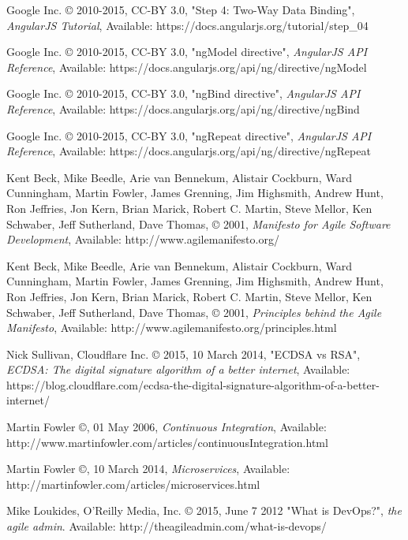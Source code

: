 \begin{thebibliography}{999}
\raggedright
Google Inc. © 2010-2015, CC-BY 3.0, "Step 4: Two-Way Data Binding",
{\em AngularJS Tutorial},
Available: https://docs.angularjs.org/tutorial/step\_04

\raggedright
Google Inc. © 2010-2015, CC-BY 3.0, "ngModel directive",
{\em AngularJS API Reference},
Available: https://docs.angularjs.org/api/ng/directive/ngModel

\raggedright
Google Inc. © 2010-2015, CC-BY 3.0, "ngBind directive",
{\em AngularJS API Reference},
Available: https://docs.angularjs.org/api/ng/directive/ngBind

\raggedright
Google Inc. © 2010-2015, CC-BY 3.0, "ngRepeat directive",
{\em AngularJS API Reference},
Available: https://docs.angularjs.org/api/ng/directive/ngRepeat

\raggedright
Kent Beck, Mike Beedle, Arie van Bennekum, Alistair Cockburn, Ward Cunningham,
Martin Fowler, James Grenning, Jim Highsmith, Andrew Hunt, Ron Jeffries, Jon
Kern, Brian Marick, Robert C. Martin, Steve Mellor, Ken Schwaber, Jeff
Sutherland, Dave Thomas, © 2001,
{\em Manifesto for Agile Software Development},
Available: http://www.agilemanifesto.org/

\raggedright
Kent Beck, Mike Beedle, Arie van Bennekum, Alistair Cockburn, Ward Cunningham,
Martin Fowler, James Grenning, Jim Highsmith, Andrew Hunt, Ron Jeffries, Jon
Kern, Brian Marick, Robert C. Martin, Steve Mellor, Ken Schwaber, Jeff
Sutherland, Dave Thomas, © 2001,
{\em Principles behind the Agile Manifesto},
Available: http://www.agilemanifesto.org/principles.html

\raggedright
Nick Sullivan, Cloudflare Inc. © 2015, 10 March 2014, "ECDSA vs RSA",
{\em ECDSA: The digital signature algorithm of a better internet},
Available: https://blog.cloudflare.com/ecdsa-the-digital-signature-algorithm-of-a-better-internet/

\raggedright
Martin Fowler ©, 01 May 2006,
{\em Continuous Integration},
Available: http://www.martinfowler.com/articles/continuousIntegration.html

\raggedright
Martin Fowler ©, 10 March 2014,
{\em Microservices},
Available: http://martinfowler.com/articles/microservices.html

\raggedright
Mike Loukides, O'Reilly Media, Inc. © 2015, June 7 2012
"What is DevOps?",
{\em the agile admin}.
Available: http://theagileadmin.com/what-is-devops/


\end{thebibliography}
